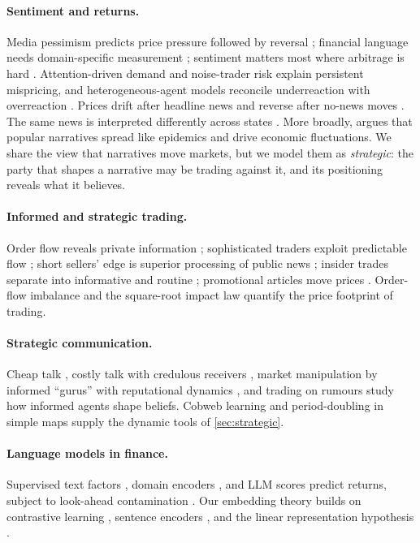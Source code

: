 \documentclass[11pt,a4paper]{article}
\theoremstyle{plain}
\theoremstyle{definition}
\theoremstyle{remark}
\begin{document}
\paragraph{Sentiment and returns.} Media pessimism predicts price pressure followed by reversal \citep{tetlock2007}; financial language needs domain-specific measurement \citep{loughran2011}; sentiment matters most where arbitrage is hard \citep{baker2006}. Attention-driven demand \citep{barber2008,da2011} and noise-trader risk \citep{delong1990,shleifer1997} explain persistent mispricing, and heterogeneous-agent models reconcile underreaction with overreaction \citep{hong1999}. Prices drift after headline news and reverse after no-news moves \citep{chan2003}. The same news is interpreted differently across states \citep{veronesi1999}. More broadly, \citet{shiller2017} argues that popular narratives spread like epidemics and drive economic fluctuations. We share the view that narratives move markets, but we model them as \emph{strategic}: the party that shapes a narrative may be trading against it, and its positioning reveals what it believes.

\paragraph{Informed and strategic trading.} Order flow reveals private information \citep{kyle1985,glosten1985}; sophisticated traders exploit predictable flow \citep{brunnermeier2005}; short sellers' edge is superior processing of public news \citep{engelberg2012}; insider trades separate into informative and routine \citep{cohen2012}; promotional articles move prices \citep{kogan2023}. Order-flow imbalance \citep{cont2014} and the square-root impact law \citep{bouchaud2018} quantify the price footprint of trading.

\paragraph{Strategic communication.} Cheap talk \citep{crawford1982}, costly talk with credulous receivers \citep{kartik2007}, market manipulation by informed ``gurus'' with reputational dynamics \citep{benabou1992}, and trading on rumours \citep{vanbommel2003} study how informed agents shape beliefs. Cobweb learning \citep{ezekiel1938,evans2001} and period-doubling in simple maps \citep{may1976} supply the dynamic tools of \cref{sec:strategic}.

\paragraph{Language models in finance.} Supervised text factors \citep{ke2019}, domain encoders \citep{araci2019}, and LLM scores \citep{lopezlira2023} predict returns, subject to look-ahead contamination \citep{glasserman2023}. Our embedding theory builds on contrastive learning \citep{oord2018}, sentence encoders \citep{reimers2019}, and the linear representation hypothesis \citep{park2023}.
\end{document}
